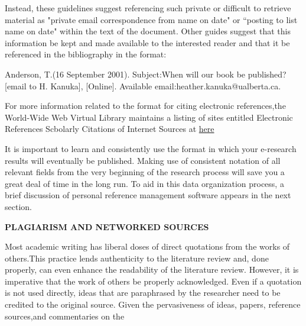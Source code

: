 \documentclass[8pt]{beamer}
\begin{document}
\begin{frame}
Instead, these guidelines suggest referencing such private or difficult to retrieve material as "private email correspondence from name on date" or “posting to list name on date" within the text of the document. Other guides suggest that this information be kept and made available to the interested reader and that it be referenced in the bibliography in the format:
\vspace{3mm}
\hspace{1cm}

Anderson, T.(16 September 2001). Subject:When will our book be published?[email to H. Kanuka], [Online]. Available email:heather.kanuka@ualberta.ca.
\vspace{5mm}

For more information related to the format for citing electronic references,the World-Wide Web Virtual Library maintains a listing of sites entitled Electronic References Scbolarly Citations of Internet Sources at
\href{http://www.spaceless.com/WWWVL/.}{here}

It is important to learn and consistently use the format in which your e-research results will eventually be published. Making use of consistent notation of all relevant fields from the very beginning of the research process will save you a great deal of time
in the long run. To aid in this data organization process, a brief discussion of personal reference management software appears in the next section.

\vspace{3mm}
\hspace{-1cm}
\textbf{PLAGIARISM AND NETWORKED SOURCES}
\vspace{3mm}

Most academic writing has liberal doses of direct quotations from the works of others.This practice lends authenticity to the literature review and, done properly, can even
enhance the readability of the literature review. However, it is imperative that the work of others be properly acknowledged. Even if a quotation is not used directly,
ideas that are paraphrased by the researcher need to be credited to the original source. Given the pervasiveness of ideas, papers, reference sources,and commentaries on the

\end{frame}
\end{document}
